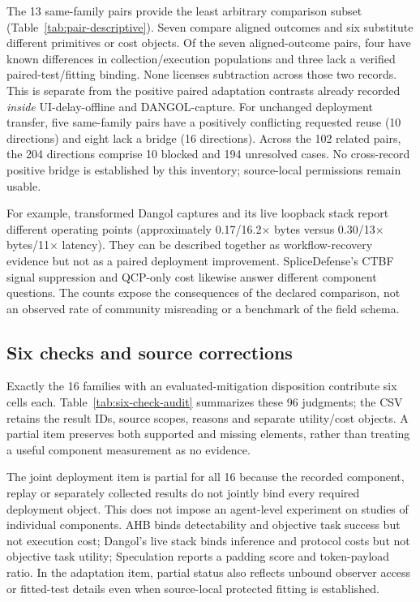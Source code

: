 The 13 same-family pairs provide the least arbitrary comparison subset (Table~\ref{tab:pair-descriptive}). Seven compare aligned outcomes and six substitute different primitives or cost objects. Of the seven aligned-outcome pairs, four have known differences in collection/execution populations and three lack a verified paired-test/fitting binding. None licenses subtraction across those two records. This is separate from the positive paired adaptation contrasts already recorded \emph{inside} UI-delay-offline and DANGOL-capture. For unchanged deployment transfer, five same-family pairs have a positively conflicting requested reuse (10 directions) and eight lack a bridge (16 directions). Across the 102 related pairs, the 204 directions comprise 10 blocked and 194 unresolved cases. No cross-record positive bridge is established by this inventory; source-local permissions remain usable.

For example, transformed Dangol captures and its live loopback stack report different operating points (approximately 0.17/16.2$\times$ bytes versus 0.30/13$\times$ bytes/11$\times$ latency). They can be described together as workflow-recovery evidence but not as a paired deployment improvement. SpliceDefense's CTBF signal suppression and QCP-only cost likewise answer different component questions. The counts expose the consequences of the declared comparison, not an observed rate of community misreading or a benchmark of the field schema.

\subsection{Six checks and source corrections}
Exactly the 16 families with an evaluated-mitigation disposition contribute six cells each. Table~\ref{tab:six-check-audit} summarizes these 96 judgments; the CSV retains the result IDs, source scopes, reasons and separate utility/cost objects. A partial item preserves both supported and missing elements, rather than treating a useful component measurement as no evidence.


The joint deployment item is partial for all 16 because the recorded component, replay or separately collected results do not jointly bind every required deployment object. This does not impose an agent-level experiment on studies of individual components. AHB binds detectability and objective task success but not execution cost; Dangol's live stack binds inference and protocol costs but not objective task utility; Speculation reports a padding score and token-payload ratio. In the adaptation item, partial status also reflects unbound observer access or fitted-test details even when source-local protected fitting is established.

